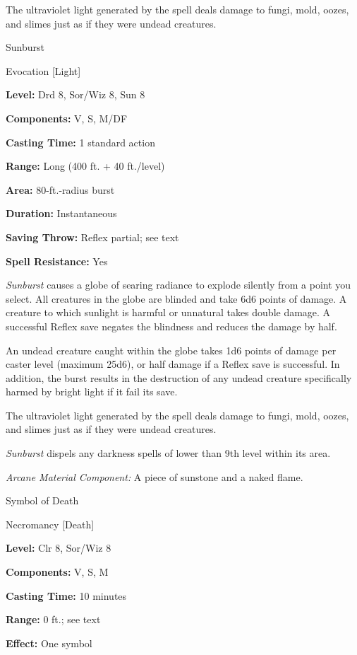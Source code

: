 \documentclass{article}
\begin{document}
The ultraviolet light generated by the spell deals damage to fungi, mold, oozes, 
and slimes just as if they were undead creatures.

\vspace{12pt}
Sunburst

Evocation [Light]

\textbf{Level:} Drd 8, Sor/Wiz 8, Sun 8

\textbf{Components:} V, S, M/DF

\textbf{Casting Time:} 1 standard action

\textbf{Range:} Long (400 ft. + 40 ft./level)

\textbf{Area:} 80-ft.-radius burst

\textbf{Duration:} Instantaneous

\textbf{Saving Throw:} Reflex partial; see text

\textbf{Spell Resistance:} Yes

\textit{Sunburst }causes a globe of searing radiance to explode silently from a 
point you select. All creatures in the globe are blinded and take 6d6 points of 
damage. A creature to which sunlight is harmful or unnatural takes double damage. 
A successful Reflex save negates the blindness and reduces the damage by half.

An undead creature caught within the globe takes 1d6 points of damage per caster 
level (maximum 25d6), or half damage if a Reflex save is successful. In addition, 
the burst results in the destruction of any undead creature specifically harmed 
by bright light if it fail its save.

The ultraviolet light generated by the spell deals damage to fungi, mold, oozes, 
and slimes just as if they were undead creatures.

\textit{Sunburst }dispels any darkness spells of lower than 9th level within its 
area.

\textit{Arcane Material Component: }A piece of sunstone and a naked flame.

\vspace{12pt}
Symbol of Death

Necromancy [Death]

\textbf{Level:} Clr 8, Sor/Wiz 8

\textbf{Components:} V, S, M

\textbf{Casting Time:} 10 minutes

\textbf{Range:} 0 ft.; see text

\textbf{Effect:} One symbol
\end{document}
